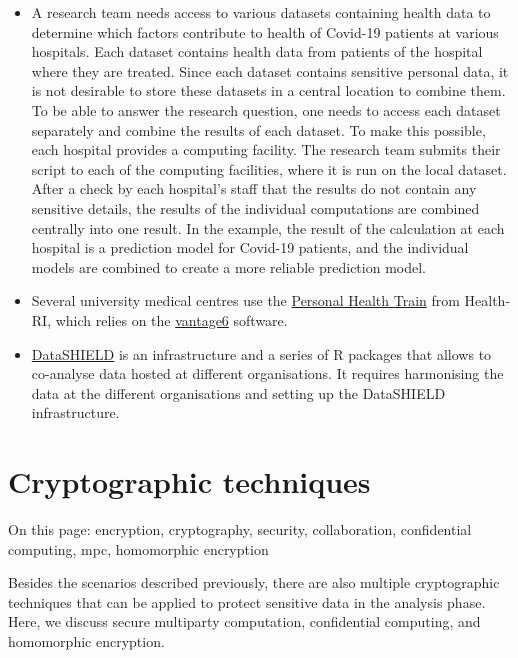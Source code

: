 \documentclass[
]{book}
\providecommand{\tightlist}{%
  \setlength{\itemsep}{0pt}\setlength{\parskip}{0pt}}
\begin{document}
\begin{itemize}
\tightlist
\item
  A research team needs access to various datasets containing health data to
  determine which factors contribute to health of Covid-19 patients at various
  hospitals. Each dataset contains health data from patients of the hospital where
  they are treated. Since each dataset contains sensitive personal data, it is not
  desirable to store these datasets in a central location to combine them. To be
  able to answer the research question, one needs to access each dataset separately
  and combine the results of each dataset. To make this possible, each hospital
  provides a computing facility. The research team submits their script to each of
  the computing facilities, where it is run on the local dataset. After a check by
  each hospital's staff that the results do not contain any sensitive details, the
  results of the individual computations are combined centrally into one result.
  In the example, the result of the calculation at each hospital is a prediction
  model for Covid-19 patients, and the individual models are combined to create a
  more reliable prediction model.
\item
  Several university medical centres use the
  \href{https://pht.health-ri.nl/}{Personal Health Train} from
  Health-RI, which relies on the \href{https://vantage6.ai/}{vantage6}
  software.
\item
  \href{https://www.datashield.org/index.php/about}{DataSHIELD} is
  an infrastructure and a series of R packages that allows to co-analyse data
  hosted at different organisations. It requires harmonising the data at the
  different organisations and setting up the DataSHIELD infrastructure.
\end{itemize}

\hypertarget{computational-cryptography}{%
\section{Cryptographic techniques}\label{computational-cryptography}}

On this page: encryption, cryptography, security, collaboration, confidential
computing, mpc, homomorphic encryption

Besides the scenarios described previously, there are also multiple cryptographic
techniques that can be applied to protect sensitive data in the analysis phase.
Here, we discuss secure multiparty computation, confidential computing, and
homomorphic encryption.
\end{document}
